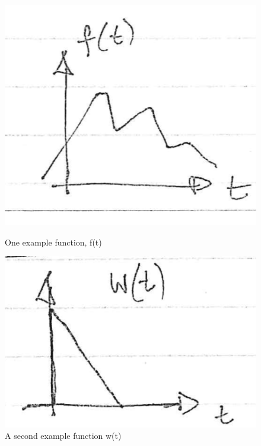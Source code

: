 \documentclass[11pt]{article}
\begin{document}
    \begin{figure}
        \begin{minipage}[t]{.49\textwidth}    
        \centering
        \includegraphics[width=\textwidth]{figures/lecture03/ffunction.png}
            \caption{One example function, f(t)}
        \label{fig:example function f(t)}
        \end{minipage}\hfill
        \begin{minipage}[t]{.49\textwidth}    
        \centering
        \includegraphics[width=\textwidth]{figures/lecture03/wfunction.png}
        \caption{A second example function w(t)}
        \label{fig:example function w(t)}
        \end{minipage}
    \end{figure}
    
\end{document}
